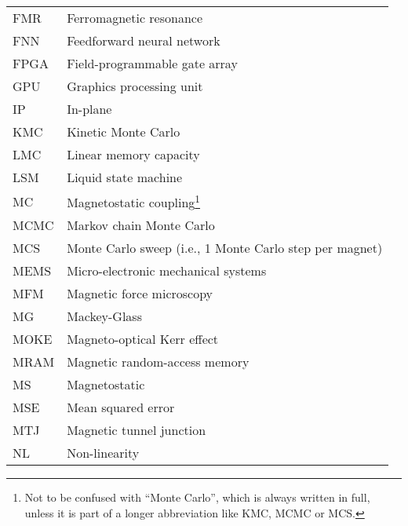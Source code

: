 {\begin{longtable}[l]{ll}
        FMR   & Ferromagnetic resonance                     \\
        FNN   & Feedforward neural network                  \\
        FPGA  & Field-programmable gate array               \\
        GPU   & Graphics processing unit                    \\
        IP    & In-plane                                    \\
        KMC   & Kinetic Monte Carlo                         \\
        LMC   & Linear memory capacity                      \\
        LSM   & Liquid state machine                        \\
        MC    & Magnetostatic coupling\footnote{Not to be confused with ``Monte Carlo'', which is always written in full, unless it is part of a longer abbreviation like KMC, MCMC or MCS.} \\
        MCMC  & Markov chain Monte Carlo                    \\
        MCS   & Monte Carlo sweep (i.e., 1 Monte Carlo step per magnet) \\
        MEMS  & Micro-electronic mechanical systems         \\
        MFM   & Magnetic force microscopy                   \\
        MG    & Mackey-Glass                                \\
        MOKE  & Magneto-optical Kerr effect                 \\
        MRAM  & Magnetic random-access memory               \\
        MS    & Magnetostatic                               \\
        MSE   & Mean squared error                          \\
        MTJ   & Magnetic tunnel junction                    \\
        NL    & Non-linearity                               \\

\end{longtable}}
